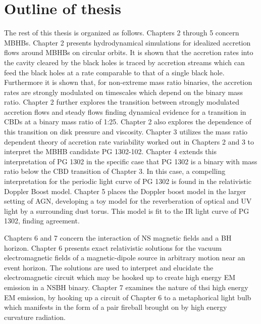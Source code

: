 {\section{Outline of thesis}  
The rest of this thesis is organized as follows.
Chapters 2 through 5 concern MBHBs. Chapter 2 presents hydrodynamical
simulations for idealized accretion flows around MBHBs on circular orbits. It
is shown that the accretion rates into the cavity cleared by the black holes
is traced by accretion streams which can feed the black holes at a rate
comparable to that of a single black hole. Furthermore it is shown that, for
non-extreme mass ratio binaries, the accretion rates are strongly modulated on
timescales which depend on the binary mass ratio. Chapter 2 further explores
the transition between strongly modulated accretion flows and steady flows
finding dynamical evidence for a transition in CBDs at a binary mass ratio of
1:25. Chapter 2 also explores the dependence of this transition on disk
pressure and viscosity. Chapter 3 utilizes the mass ratio dependent theory of
accretion rate variability worked out in Chapters 2 and 3 to interpret the
MBHB candidate PG 1302-102. Chapter 4 extends this interpretation of PG 1302
in the specific case that PG 1302 is a binary with mass ratio below the CBD
transition of Chapter 3. In this case, a compelling interpretation for the
periodic light curve of PG 1302 is found in the relativistic Doppler Boost
model. Chapter 5 places the Doppler boost model in the larger setting of AGN,
developing a toy model for the reverberation of optical and UV light by a
surrounding dust torus. This model is fit to the IR light curve of PG 1302,
finding agreement.

Chapters 6 and 7 concern the interaction of NS magnetic fields and a BH
horizon. Chapter 6 presents exact relativistic solutions for the vacuum
electromagnetic fields of a magnetic-dipole source in arbitrary motion near an
event horizon. The solutions are used to interpret and elucidate the
electromagnetic circuit which may be hooked up to create high energy EM
emission in a NSBH binary. Chapter 7 examines the nature of thsi high energy EM emission, by hooking up a circuit of Chapter 6 to a metaphorical light
bulb which manifests in the form of a pair fireball brought on by high energy
curvature radiation.



















}

